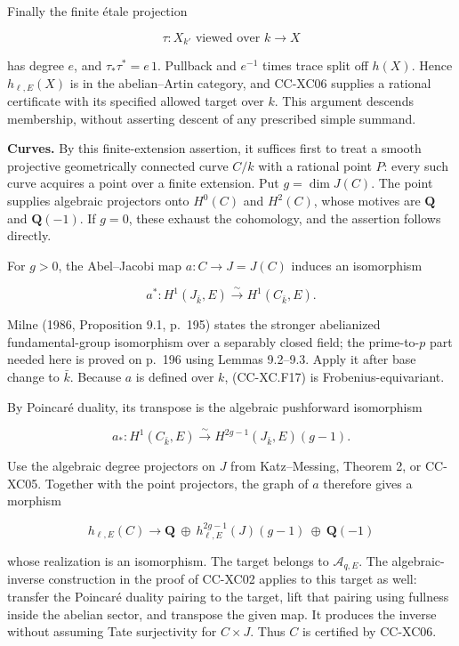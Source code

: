 Finally the finite étale projection

\[
 \tau:X_{k'}\text{ viewed over }k\longrightarrow X
\]

has degree \(e\), and \(\tau_*\tau^*=e\,1\). Pullback and \(e^{-1}\)
times trace split off \(h(X)\). Hence \(h_{\ell,E}(X)\) is in the
abelian--Artin category, and CC-XC06 supplies a rational certificate
with its specified allowed target over \(k\). This argument descends
membership, without asserting descent of any prescribed simple summand.

\textbf{Curves.} By this finite-extension assertion, it suffices first
to treat a smooth projective geometrically connected curve \(C/k\) with
a rational point \(P\): every such curve acquires a point over a finite
extension. Put \(g=\dim J(C)\). The point supplies algebraic projectors
onto \(H^0(C)\) and \(H^2(C)\), whose motives are \(\mathbf Q\) and
\(\mathbf Q(-1)\). If \(g=0\), these exhaust the cohomology, and the
assertion follows directly.

For \(g>0\), the Abel--Jacobi map \(a:C\to J=J(C)\) induces an
isomorphism

\[
 a^*:H^1(J_{\bar k},E)\xrightarrow{\sim}H^1(C_{\bar k},E).
 \tag{CC-XC.F17}
\]

Milne (1986, Proposition 9.1, p.~195) states the stronger abelianized
fundamental-group isomorphism over a separably closed field; the
prime-to-\(p\) part needed here is proved on p.~196 using Lemmas
9.2--9.3. Apply it after base change to \(\bar k\). Because \(a\) is
defined over \(k\), (CC-XC.F17) is Frobenius-equivariant.

By Poincaré duality, its transpose is the algebraic pushforward
isomorphism

\[
 a_*:H^1(C_{\bar k},E)
       \xrightarrow{\sim}H^{2g-1}(J_{\bar k},E)(g-1).
 \tag{CC-XC.F18}
\]

Use the algebraic degree projectors on \(J\) from Katz--Messing, Theorem
2, or CC-XC05. Together with the point projectors, the graph of \(a\)
therefore gives a morphism

\[
 h_{\ell,E}(C)\longrightarrow
 \mathbf Q\ \oplus\
 h^{2g-1}_{\ell,E}(J)(g-1)\
 \oplus\ \mathbf Q(-1)
 \tag{CC-XC.F19}
\]

whose realization is an isomorphism. The target belongs to
\(\mathcal A_{q,E}\). The algebraic-inverse construction in the proof of
CC-XC02 applies to this target as well: transfer the Poincaré duality
pairing to the target, lift that pairing using fullness inside the
abelian sector, and transpose the given map. It produces the inverse
without assuming Tate surjectivity for \(C\times J\). Thus \(C\) is
certified by CC-XC06.

